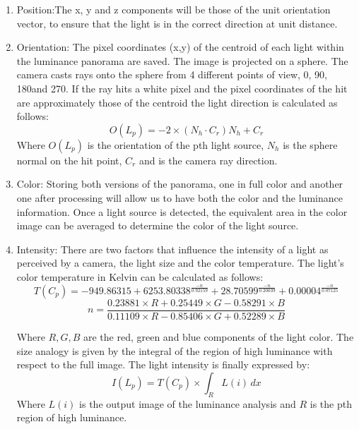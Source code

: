 \begin{enumerate}
\item Position:The x, y and z components will be those of the unit orientation vector, to ensure that the light is in the correct direction at unit distance.

\item  Orientation: The pixel coordinates (x,y) of the centroid of each light within the luminance panorama are saved. The image is projected on a sphere. The camera casts rays onto the sphere from 4 different points of view, 0\degree , 90\degree, 180\degree  and 270\degree. If the ray hits a white pixel and the pixel coordinates of the hit are approximately those of the centroid the light direction is calculated as follows:
\begin{equation}
    O(L_p) = -2 \times (N_h \cdot C_r) N_h + C_r
\end{equation}
Where $O(L_p)$ is the orientation of the pth light source, $N_h$ is the sphere normal on the hit point, $C_r$ and is the camera ray direction.
\item Color: Storing both versions of the panorama, one in full color and another one after processing will allow us to have both the color and the luminance information. Once a light source is detected, the equivalent area in the color image can be averaged to determine the color of the light source.
\item Intensity: There are two factors that influence the intensity of a light as perceived by a camera, the light size and the color temperature. The light's color temperature in Kelvin can be calculated as follows:
\begin{equation}
    T(C_p) = -949.86315 + 6253.80338 ^ {\frac{-n}{0.92159} } + 28.70599 ^{\frac{-n}{0.20039} } + 0.00004 ^ {\frac{-n}{0.07125} }
\end{equation}
\begin{equation}
n = {\frac{0.23881\times R + 0.25449\times G - 0.58291\times B}{0.11109\times R - 0.85406\times G + 0.52289\times B} }
\end{equation}

Where $R, G, B$ are the red, green and blue components of the light color.\newline 
The size analogy is given by the integral of the region of high luminance with respect to the full image. The light intensity is finally expressed by:
\begin{equation}
I(L_p) = T(C_p) \times \int_R L(i) \,dx
\end{equation}
Where $L(i)$ is the output image of the luminance analysis and $R$ is the pth region of high luminance.\newline 

\end{enumerate}

